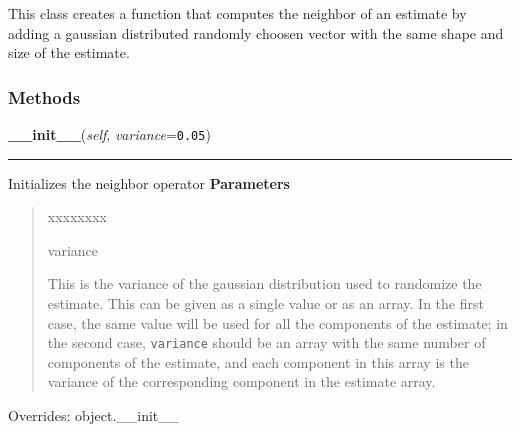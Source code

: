 This class creates a function that computes the neighbor of an estimate by
adding a gaussian distributed randomly choosen vector with the same shape
and size of the estimate.


  \subsubsection{Methods}

    \vspace{0.5ex}

\hspace{.8\funcindent}\begin{boxedminipage}{\funcwidth}

    \raggedright \textbf{\_\_init\_\_}(\textit{self}, \textit{variance}={\tt 0.05})

    \vspace{-1.5ex}

    \rule{\textwidth}{0.5\fboxrule}
\setlength{\parskip}{2ex}

Initializes the neighbor operator
\setlength{\parskip}{1ex}
      \textbf{Parameters}
      \vspace{-1ex}

      \begin{quote}
        \begin{Ventry}{xxxxxxxx}

          \item[variance]


This is the variance of the gaussian distribution used to randomize
the estimate. This can be given as a single value or as an array. In
the first case, the same value will be used for all the components
of the estimate; in the second case, \texttt{variance} should be an array
with the same number of components of the estimate, and each
component in this array is the variance of the corresponding
component in the estimate array.
        \end{Ventry}

      \end{quote}

      Overrides: object.\_\_init\_\_

    \end{boxedminipage}

